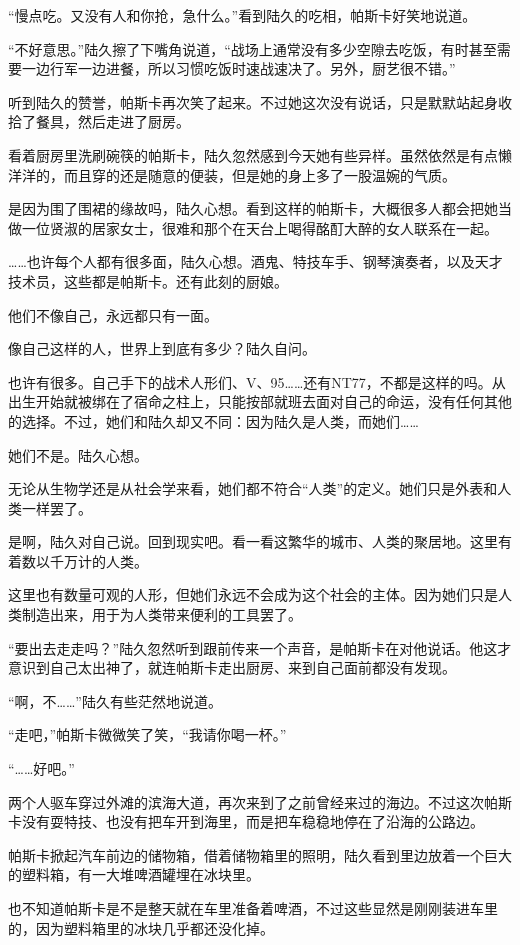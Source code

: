“慢点吃。又没有人和你抢，急什么。”看到陆久的吃相，帕斯卡好笑地说道。

“不好意思。”陆久擦了下嘴角说道，“战场上通常没有多少空隙去吃饭，有时甚至需要一边行军一边进餐，所以习惯吃饭时速战速决了。另外，厨艺很不错。”

听到陆久的赞誉，帕斯卡再次笑了起来。不过她这次没有说话，只是默默站起身收拾了餐具，然后走进了厨房。

看着厨房里洗刷碗筷的帕斯卡，陆久忽然感到今天她有些异样。虽然依然是有点懒洋洋的，而且穿的还是随意的便装，但是她的身上多了一股温婉的气质。

是因为围了围裙的缘故吗，陆久心想。看到这样的帕斯卡，大概很多人都会把她当做一位贤淑的居家女士，很难和那个在天台上喝得酩酊大醉的女人联系在一起。

……也许每个人都有很多面，陆久心想。酒鬼、特技车手、钢琴演奏者，以及天才技术员，这些都是帕斯卡。还有此刻的厨娘。

他们不像自己，永远都只有一面。

像自己这样的人，世界上到底有多少？陆久自问。

也许有很多。自己手下的战术人形们、V、95……还有NT77，不都是这样的吗。从出生开始就被绑在了宿命之柱上，只能按部就班去面对自己的命运，没有任何其他的选择。不过，她们和陆久却又不同：因为陆久是人类，而她们……

她们不是。陆久心想。

无论从生物学还是从社会学来看，她们都不符合“人类”的定义。她们只是外表和人类一样罢了。

是啊，陆久对自己说。回到现实吧。看一看这繁华的城市、人类的聚居地。这里有着数以千万计的人类。

这里也有数量可观的人形，但她们永远不会成为这个社会的主体。因为她们只是人类制造出来，用于为人类带来便利的工具罢了。

“要出去走走吗？”陆久忽然听到跟前传来一个声音，是帕斯卡在对他说话。他这才意识到自己太出神了，就连帕斯卡走出厨房、来到自己面前都没有发现。

“啊，不……”陆久有些茫然地说道。

“走吧，”帕斯卡微微笑了笑，“我请你喝一杯。”

“……好吧。”

两个人驱车穿过外滩的滨海大道，再次来到了之前曾经来过的海边。不过这次帕斯卡没有耍特技、也没有把车开到海里，而是把车稳稳地停在了沿海的公路边。

帕斯卡掀起汽车前边的储物箱，借着储物箱里的照明，陆久看到里边放着一个巨大的塑料箱，有一大堆啤酒罐埋在冰块里。

也不知道帕斯卡是不是整天就在车里准备着啤酒，不过这些显然是刚刚装进车里的，因为塑料箱里的冰块几乎都还没化掉。

